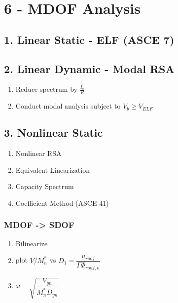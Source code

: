 \hypertarget{mdof-analysis}{%
\section{6 - MDOF Analysis}\label{mdof-analysis}}

\hypertarget{linear-static---elf-asce-7}{%
\subsection{1. Linear Static - ELF (ASCE
7)}\label{linear-static---elf-asce-7}}

\hypertarget{linear-dynamic---modal-rsa}{%
\subsection{2. Linear Dynamic - Modal
RSA}\label{linear-dynamic---modal-rsa}}

\begin{enumerate}
\def\labelenumi{\arabic{enumi}.}
\tightlist
\item
  Reduce spectrum by \(\frac{I_e}{R}\)
\item
  Conduct modal analysis subject to \(V_b\geq V_{ELF}\)
\end{enumerate}

\hypertarget{nonlinear-static}{%
\subsection{3. Nonlinear Static}\label{nonlinear-static}}

\begin{enumerate}
\def\labelenumi{\arabic{enumi}.}
\tightlist
\item
  Nonlinear RSA
\item
  Equivalent Linearization
\item
  Capacity Spectrum
\item
  Coefficient Method (ASCE 41)
\end{enumerate}

\hypertarget{mdof---sdof}{%
\subsubsection{MDOF -\textgreater{} SDOF}\label{mdof---sdof}}

\begin{enumerate}
\def\labelenumi{\arabic{enumi}.}
\tightlist
\item
  Bilinearize
\item
  plot \(V/M^*_n\) vs \(D_1=\dfrac{u_{roof}}{\Gamma \Phi_{roof, n}}\)
\item
  \(\omega = \sqrt{\dfrac{V_{yn}}{M^*_{n}D_{yn}}}\)
\end{enumerate}
